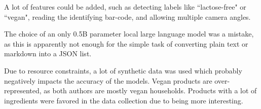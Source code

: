 \documentclass[a4paper,11pt]{report}
\begin{document}
            A lot of features could be added, such as detecting labels like ``lactose-free" or ``vegan", reading the identifying bar-code, and allowing multiple camera angles.
            
            The choice of an only 0.5B parameter local large language model was a mistake, as this is apparently not enough for the simple task of converting plain text or markdown into a JSON list.
            
            Due to resource constraints, a lot of synthetic data was used which probably negatively impacts the accuracy of the models. Vegan products are over-represented, as both authors are mostly vegan households. Products with a lot of ingredients were favored in the data collection due to being more interesting.
        


    \printbibliography[heading=bibintoc]
\end{document}
